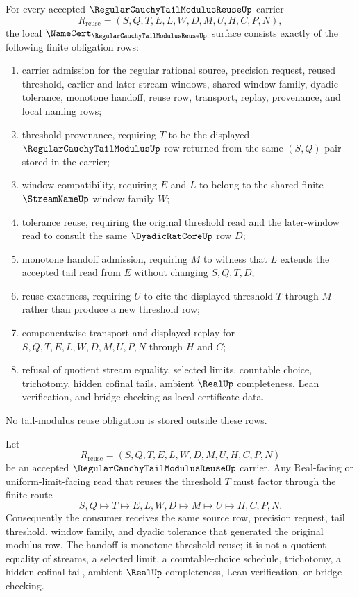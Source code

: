 \begin{theorem}
\label{thm:regular-cauchy-tail-modulus-reuse-namecert-obligations}
For every accepted $\RegularCauchyTailModulusReuseUp$ carrier
$$
R_{\mathrm{reuse}}=(S,Q,T,E,L,W,D,M,U,H,C,P,N),
$$
the local $\NameCert_{\RegularCauchyTailModulusReuseUp}$ surface consists exactly of the following finite obligation rows:
\begin{enumerate}
\item carrier admission for the regular rational source, precision request, reused threshold, earlier and later stream windows, shared window family, dyadic tolerance, monotone handoff, reuse row, transport, replay, provenance, and local naming rows;
\item threshold provenance, requiring $T$ to be the displayed $\RegularCauchyTailModulusUp$ row returned from the same $(S,Q)$ pair stored in the carrier;
\item window compatibility, requiring $E$ and $L$ to belong to the shared finite $\StreamNameUp$ window family $W$;
\item tolerance reuse, requiring the original threshold read and the later-window read to consult the same $\DyadicRatCoreUp$ row $D$;
\item monotone handoff admission, requiring $M$ to witness that $L$ extends the accepted tail read from $E$ without changing $S,Q,T,D$;
\item reuse exactness, requiring $U$ to cite the displayed threshold $T$ through $M$ rather than produce a new threshold row;
\item componentwise transport and displayed replay for $S,Q,T,E,L,W,D,M,U,P,N$ through $H$ and $C$;
\item refusal of quotient stream equality, selected limits, countable choice, trichotomy, hidden cofinal tails, ambient $\RealUp$ completeness, Lean verification, and bridge checking as local certificate data.
\end{enumerate}
No tail-modulus reuse obligation is stored outside these rows.
\end{theorem}

\begin{theorem}
\label{thm:regular-cauchy-tail-modulus-reuse-monotone-handoff}
Let
$$
R_{\mathrm{reuse}}=(S,Q,T,E,L,W,D,M,U,H,C,P,N)
$$
be an accepted $\RegularCauchyTailModulusReuseUp$ carrier. Any Real-facing or uniform-limit-facing read that reuses the threshold $T$ must factor through the finite route
$$
S,Q \longmapsto T \longmapsto E,L,W,D \longmapsto M \longmapsto U \longmapsto H,C,P,N .
$$
Consequently the consumer receives the same source row, precision request, tail threshold, window family, and dyadic tolerance that generated the original modulus row. The handoff is monotone threshold reuse; it is not a quotient equality of streams, a selected limit, a countable-choice schedule, trichotomy, a hidden cofinal tail, ambient $\RealUp$ completeness, Lean verification, or bridge checking.
\end{theorem}

